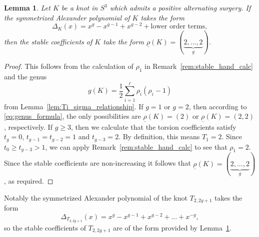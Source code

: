 \documentclass{amsart} %
\theoremstyle{thm}
\newtheorem{lem}[Theorem]{Lemma}
\theoremstyle{definition}
\numberwithin{equation}{section}
\begin{document}
\begin{lem}\label{lem:2strandpoly}
    Let $K$ be a knot in $S^3$ which admits a positive alternating surgery. If the symmetrized Alexander polynomial of $K$ takes the form
    \[
    \Delta_K(x)=x^g-x^{g-1}+x^{g-2} + \text{lower order terms},
    \]
    then the stable coefficients of $K$ take the form $\underline{\rho}(K)=(\underbrace{2,\dots,2}_{g})$.
\end{lem}
\begin{proof}
This follows from the calculation of $\rho_1$ in Remark~\ref{rem:stable_hand_calc} and the genus
\begin{equation}\label{eq:genus_formula}
    g(K)=\frac12 \sum_{i=1}^\ell \rho_i(\rho_i-1)
\end{equation}
from Lemma~\ref{lem:Ti_sigma_relationship}.
If $g=1$ or $g=2$, then according to \eqref{eq:genus_formula}, the only possibilities are $\underline{\rho}(K)=(2)$ or $\underline{\rho}(K)=(2,2)$, respectively. If $g\geq 3$, then we calculate that the torsion coefficients satisfy $t_{g}=0$, $t_{g-1}=t_{g-2}=1$ and $t_{g-3}=2$. By definition, this means $T_1=2$. Since $t_0\geq t_{g-3}>1$, we can apply Remark~\ref{rem:stable_hand_calc} to see that $\rho_1=2$. Since the stable coefficients are non-increasing it follows that $\underline{\rho}(K)=(\underbrace{2,\dots,2}_{g})$, as required.
\end{proof}

Notably the symmetrized Alexander polynomial of the knot $T_{2,2g+1}$ takes the form
\[
\Delta_{T_{2,2g+1}}(x)=x^g -x^{g-1} + x^{g-2}+ \dots + x^{-g},
\]
so the stable coefficients of $T_{2,2g+1}$ are of the form provided by Lemma~\ref{lem:2strandpoly}.
\end{document}
